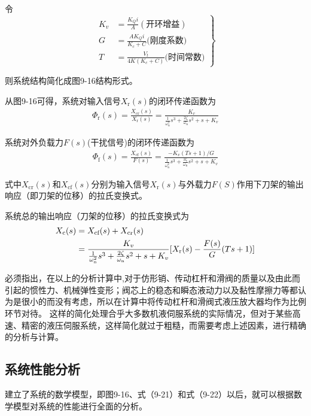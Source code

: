 \noindent 令
\begin{equation}
\left.\begin{aligned}
K_{v}&=\frac{K_{Q}i}{A}(\text{开环增益}) \\
G&=\frac{AK_{Q}i}{K_{c}+C}\text{(刚度系数)} \\
T&=\frac{V_{t}}{4K(K_{c}+C)}\text{(时间常数)}
\end{aligned}\right\}
\end{equation}

\noindent 则系统结构简化成图9-16结构形式。

从图9-16可得，系统对输入信号$X_{\text{r}}(s)$的闭环传递函数为
\begin{align}
    \varPhi_{\text{r}}(s)=\frac{X_{\text{cr}}(s)}{X_{\text{r}}(s)}=\frac{K_{v}}{\frac{1}{\omega_{\text{n}}^2}s^3+\frac{2\zeta }{\omega_{\text{n}}}s^2+s+K_{v}}
\end{align}

\noindent 系统对外负载力$F(s)$(干扰信号)的闭环传递函数为
\begin{align}
    \varPhi_{\text{f}}(s)=\frac{X_{\text{cf}}(s)}{F(s)}=\frac{-K_{v}(Ts+1)/G}{\frac{1}{\omega_{\text{n}}^2}s^3+\frac{2\zeta }{\omega_{\text{n}}}s^2+s+K_{v}}
\end{align}

\noindent 式中$X_{\text{cr}}(s)$和$X_{\text{cf}}(s)$分别为输入信号$X_{\text{r}}(s)$与外载力$F(S)$作用下刀架的输出响应（即刀架的位移）的拉氏变换式。

系统总的输出响应（刀架的位移）的拉氏变换式为
\begin{align}
    X_{\text{c}}(s)&=X_{\text{cf}}(s)+X_{\text{cr}}(s) \notag \\
    &=\frac{K_{v}}{\frac{1}{\omega_{\text{n}}^2}s^3+\frac{2\zeta }{\omega_{\text{n}}}s^2+s+K_{v}}[X_{\text{r}}(s)-\frac{F(s)}{G}(Ts+1)]
\end{align}

必须指出，在以上的分析计算中,对于仿形销、传动杠杆和滑阀的质量以及由此而引起的惯性力、机械弹性变形；阀芯上的稳态和瞬态液动力以及黏性摩擦力等都认为是很小的而没有考虑，所以在计算中将传动杠杆和滑阀式液压放大器均作为比例环节对待。
这样的简化处理合乎大多数机液伺服系统的实际情况，但对于某些高速、精密的液压伺服系统，这样简化就过于粗糙，而需要考虑上述因素，进行精确的分析与计算。

\subsection{系统性能分析}

建立了系统的数学模型，即图9-16、式（9-21）和式（9-22）以后，就可以根据数学模型对系统的性能进行全面的分析。

